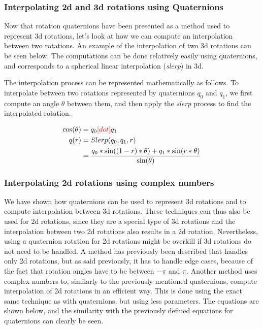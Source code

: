 		\subsubsection{Interpolating 2d and 3d rotations using Quaternions}
		
		Now that rotation quaternions have been presented as a method used to represent 3d rotations, let's look at how we can compute an interpolation between two rotations. An example of the interpolation of two 3d rotations can be seen below.  The computations can be done relatively easily using quaternions, and corresponds to a spherical linear interpolation (\textit{slerp}) in 3d.
		
		The interpolation process can be represented mathematically as follows. To interpolate between two rotations represented by quaternions \( q_0 \) and \( q_1 \), we first compute an angle \( \theta \) between them, and then apply the \textit{slerp} process to find the interpolated rotation.
		
		\begin{equation}
		\begin{split}
			\cos(\theta) 	& = q_0 \textcolor{red}{[dot]} q_1 \\
			q(r) 			& = Slerp(q_0, q_1, r) \\
							& = \frac{q_0 * \sin((1-r)*\theta) + q_1 * \sin(r*\theta)}{\sin(\theta)}
		\end{split}
		\end{equation}
			
		\subsubsection{Interpolating 2d rotations using complex numbers}
		
		We have shown how quaternions can be used to represent 3d rotations and to compute interpolation between 3d rotations. These techniques can thus also be used for 2d rotations, since they are a special type of 3d rotations and the interpolation between two 2d rotations also results in a 2d rotation.
		Nevertheless, using a quaternion rotation for 2d rotations might be overkill if 3d rotations do not need to be handled. A method has previously been described that handles only 2d rotations, but as said previously, it has to handle edge cases, because of the fact that rotation angles have to be between \( - \pi \) and \( \pi \). Another method uses complex numbers to, similarly to the previously mentioned quaternions, compute interpolation of 2d rotations in an efficient way. This is done using the exact same technique as with quaternions, but using less parameters. The equations are shown below, and the similarity with the previously defined equations for quaternions can clearly be seen.
		
